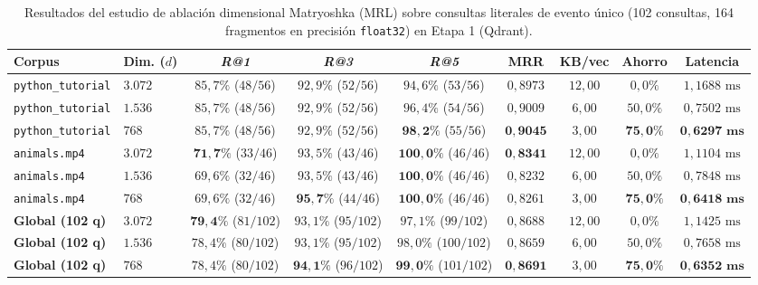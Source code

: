 \begin{table}[htbp]
\centering
\small
\setlength{\tabcolsep}{3pt}
\caption{Resultados del estudio de ablación dimensional Matryoshka (MRL) sobre consultas literales de evento único (102 consultas, 164 fragmentos en precisión \texttt{float32}) en Etapa 1 (Qdrant).}
\label{tab:ablacion_mrl_literales}
\begin{adjustbox}{max width=\linewidth}
\begin{tabular}{llccccccc}
\toprule
\textbf{Corpus} & \textbf{Dim. ($d$)} & \textbf{\textit{R@1}} & \textbf{\textit{R@3}} & \textbf{\textit{R@5}} & \textbf{MRR} & \textbf{KB/vec} & \textbf{Ahorro} & \textbf{Latencia} \\
\midrule
\texttt{python\_tutorial} & $3.072$ & $85,7\%$ ($48/56$) & $92,9\%$ ($52/56$) & $94,6\%$ ($53/56$) & $0,8973$ & $12,00$ & $0,0\%$ & $1,1688\text{ ms}$ \\
\texttt{python\_tutorial} & $1.536$ & $85,7\%$ ($48/56$) & $92,9\%$ ($52/56$) & $96,4\%$ ($54/56$) & $0,9009$ & $6,00$ & $50,0\%$ & $0,7502\text{ ms}$ \\
\texttt{python\_tutorial} & $768$   & $85,7\%$ ($48/56$) & $92,9\%$ ($52/56$) & $\mathbf{98,2\%}$ ($55/56$) & $\mathbf{0,9045}$ & $3,00$ & $\mathbf{75,0\%}$ & $\mathbf{0,6297\text{ ms}}$ \\
\midrule
\texttt{animals.mp4}      & $3.072$ & $\mathbf{71,7\%}$ ($33/46$) & $93,5\%$ ($43/46$) & $\mathbf{100,0\%}$ ($46/46$) & $\mathbf{0,8341}$ & $12,00$ & $0,0\%$ & $1,1104\text{ ms}$ \\
\texttt{animals.mp4}      & $1.536$ & $69,6\%$ ($32/46$) & $93,5\%$ ($43/46$) & $\mathbf{100,0\%}$ ($46/46$) & $0,8232$ & $6,00$ & $50,0\%$ & $0,7848\text{ ms}$ \\
\texttt{animals.mp4}      & $768$   & $69,6\%$ ($32/46$) & $\mathbf{95,7\%}$ ($44/46$) & $\mathbf{100,0\%}$ ($46/46$) & $0,8261$ & $3,00$ & $\mathbf{75,0\%}$ & $\mathbf{0,6418\text{ ms}}$ \\
\midrule
\textbf{Global (102 q)}   & $3.072$ & $\mathbf{79,4\%}$ ($81/102$) & $93,1\%$ ($95/102$) & $97,1\%$ ($99/102$) & $0,8688$ & $12,00$ & $0,0\%$ & $1,1425\text{ ms}$ \\
\textbf{Global (102 q)}   & $1.536$ & $78,4\%$ ($80/102$) & $93,1\%$ ($95/102$) & $98,0\%$ ($100/102$) & $0,8659$ & $6,00$ & $50,0\%$ & $0,7658\text{ ms}$ \\
\textbf{Global (102 q)}   & $768$   & $78,4\%$ ($80/102$) & $\mathbf{94,1\%}$ ($96/102$) & $\mathbf{99,0\%}$ ($101/102$) & $\mathbf{0,8691}$ & $3,00$ & $\mathbf{75,0\%}$ & $\mathbf{0,6352\text{ ms}}$ \\
\bottomrule
\end{tabular}
\end{adjustbox}
\end{table}

